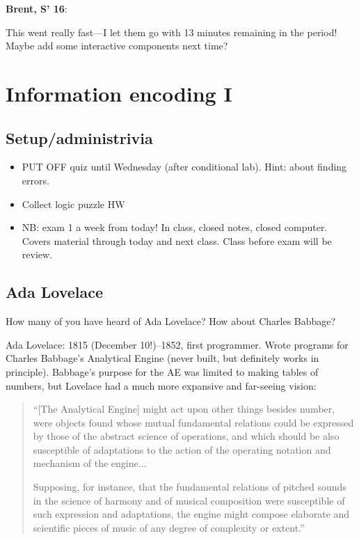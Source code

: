 \documentclass{article}
\newenvironment{reflect}[1]
{
  \begin{lrbox}{\reflectbox}
    \begin{minipage}[t]{\textwidth}
      \textbf{#1}:
}{
    \end{minipage}
  \end{lrbox}
  \fbox{\usebox{\reflectbox}}
}
\begin{document}
\begin{reflect}{Brent, S' 16}
  This went really fast---I let them go with 13 minutes remaining in
  the period!  Maybe add some interactive components next time?
\end{reflect}


\newpage

\section{Information encoding I}

\subsection*{Setup/administrivia}

\begin{itemize}
\item PUT OFF quiz until Wednesday (after conditional lab).  Hint:
  about finding errors.
\item Collect logic puzzle HW
\item NB: exam 1 a week from today!  In class, closed notes, closed
  computer.  Covers material through today and next class. Class
  before exam will be review.
\end{itemize}

\subsection*{Ada Lovelace}

How many of you have heard of Ada Lovelace?  How about Charles
Babbage?

Ada Lovelace: 1815 (December 10!)--1852, first programmer.  Wrote
programs for Charles Babbage's Analytical Engine (never built, but
definitely works in principle).  Babbage's purpose for the AE was
limited to making tables of numbers, but Lovelace had a much more
expansive and far-seeing vision:

\begin{quote}
``[The Analytical Engine] might act upon other things besides number,
were objects found whose mutual fundamental relations could be
expressed by those of the abstract science of operations, and which
should be also susceptible of adaptations to the action of the
operating notation and mechanism of the engine...

Supposing, for instance, that the fundamental relations of pitched
sounds in the science of harmony and of musical composition were
susceptible of such expression and adaptations, the engine might
compose elaborate and scientific pieces of music of any degree of
complexity or extent.''
\end{quote}
\end{document}
